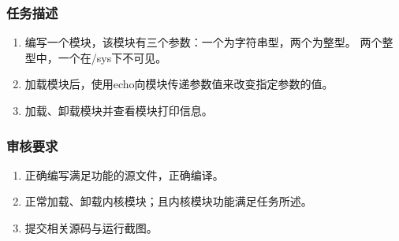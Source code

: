 \documentclass{article}
\begin{document}
\subsubsection{任务描述}
\begin{enumerate}
    \item 编写一个模块，该模块有三个参数：一个为字符串型，两个为整型。
两个整型中，一个在/sys下不可见。
    \item 加载模块后，使用echo向模块传递参数值来改变指定参数的值。
    \item 加载、卸载模块并查看模块打印信息。

\end{enumerate}

\subsubsection{审核要求}
\begin{enumerate}
    \item 正确编写满足功能的源文件，正确编译。
    \item 正常加载、卸载内核模块；且内核模块功能满足任务所述。
    \item 提交相关源码与运行截图。
\end{enumerate}
\end{document}
